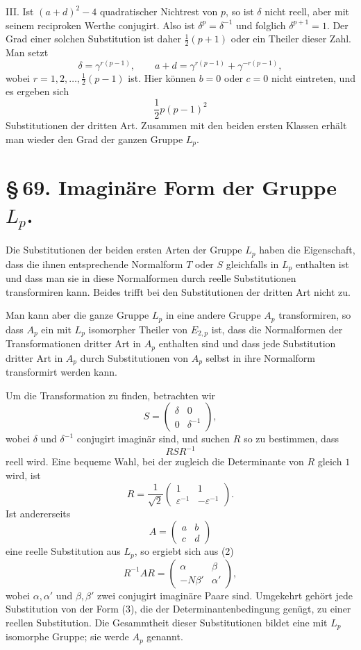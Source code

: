 \documentclass[11pt]{article}
\providecommand{\mat}[4]{\begin{pmatrix}#1&#2\\#3&#4\end{pmatrix}}
\providecommand{\mat}[4]{\begin{pmatrix}#1&#2\\#3&#4\end{pmatrix}}
\providecommand{\mat}[1]{\begin{pmatrix}#1\end{pmatrix}}
\begin{document}
III. Ist $(a+d)^2-4$ quadratischer Nichtrest von $p$, so ist $\delta$ nicht reell, aber mit seinem reciproken Werthe conjugirt. Also ist $\delta^p=\delta^{-1}$ und folglich $\delta^{p+1}=1$. Der Grad einer solchen Substitution ist daher $\frac12(p+1)$ oder ein Theiler dieser Zahl. Man setzt
\begin{equation}
 \delta=\gamma^{r(p-1)},\qquad
 a+d=\gamma^{r(p-1)}+\gamma^{-r(p-1)},
 \tag{10}
\end{equation}
wobei $r=1,2,\ldots,\frac12(p-1)$ ist. Hier können $b=0$ oder $c=0$ nicht eintreten, und es ergeben sich
\[
 \frac12p(p-1)^2
\]
Substitutionen der dritten Art. Zusammen mit den beiden ersten Klassen erhält man wieder den Grad der ganzen Gruppe $L_p$.

\section*{\S\,69. Imaginäre Form der Gruppe $L_p$.}

Die Substitutionen der beiden ersten Arten der Gruppe $L_p$ haben die Eigenschaft, dass die ihnen entsprechende Normalform $T$ oder $S$ gleichfalls in $L_p$ enthalten ist und dass man sie in diese Normalformen durch reelle Substitutionen transformiren kann. Beides trifft bei den Substitutionen der dritten Art nicht zu.

Man kann aber die ganze Gruppe $L_p$ in eine andere Gruppe $A_p$ transformiren, so dass $A_p$ ein mit $L_p$ isomorpher Theiler von $E_{2,p}$ ist, dass die Normalformen der Transformationen dritter Art in $A_p$ enthalten sind und dass jede Substitution dritter Art in $A_p$ durch Substitutionen von $A_p$ selbst in ihre Normalform transformirt werden kann.

Um die Transformation zu finden, betrachten wir
\[
 S=\mat{\delta}{0}{0}{\delta^{-1}},
\]
wobei $\delta$ und $\delta^{-1}$ conjugirt imaginär sind, und suchen $R$ so zu bestimmen, dass
\begin{equation}
 RSR^{-1}
 \tag{1}
\end{equation}
reell wird. Eine bequeme Wahl, bei der zugleich die Determinante von $R$ gleich $1$ wird, ist
\begin{equation}
 R=\frac{1}{\sqrt2}\mat{1}{1}{\varepsilon^{-1}}{-\varepsilon^{-1}}.
 \tag{2}
\end{equation}
Ist andererseits
\[
 A=\mat{a}{b}{c}{d}
\]
eine reelle Substitution aus $L_p$, so ergiebt sich aus (2)
\begin{equation}
 R^{-1}AR=
 \mat{\alpha}{\beta}{-N\beta'}{\alpha'},
 \tag{3}
\end{equation}
wobei $\alpha,\alpha'$ und $\beta,\beta'$ zwei conjugirt imaginäre Paare sind. Umgekehrt gehört jede Substitution von der Form (3), die der Determinantenbedingung genügt, zu einer reellen Substitution. Die Gesammtheit dieser Substitutionen bildet eine mit $L_p$ isomorphe Gruppe; sie werde $A_p$ genannt.
\end{document}
